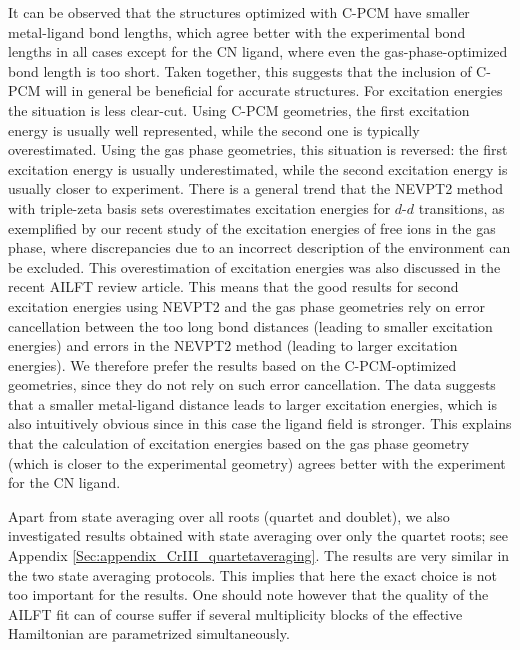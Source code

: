 It can be observed that the structures optimized with C-PCM have smaller metal-ligand bond lengths, which agree better with the experimental bond lengths in all cases except for the CN\textsuperscript{\textminus} ligand, where even the gas-phase-optimized bond length is too short. Taken together, this suggests that the inclusion of C-PCM will in general be beneficial for accurate structures. For excitation energies the situation is less clear-cut. Using C-PCM geometries, the first excitation energy is usually well represented, while the second one is typically overestimated. Using the gas phase geometries, this situation is reversed: the first excitation energy is usually underestimated, while the second excitation energy is usually closer to experiment. There is a general trend that the NEVPT2 method with triple-zeta basis sets overestimates excitation energies for $d$-$d$ transitions, as exemplified by our recent study of the excitation energies of free ions in the gas phase,\cite{LangN_2019_104104} where discrepancies due to an incorrect description of the environment can be excluded. This overestimation of excitation energies was also discussed in the recent AILFT review article.\cite{SinghEAN_2017_2} This means that the good results for second excitation energies using NEVPT2 and the gas phase geometries rely on error cancellation between the too long bond distances (leading to smaller excitation energies) and errors in the NEVPT2 method (leading to larger excitation energies). We therefore prefer the results based on the \mbox{C-PCM}-optimized geometries, since they do not rely on such error cancellation. The data suggests that a smaller metal-ligand distance leads to larger excitation energies, which is also intuitively obvious since in this case the ligand field is stronger. This explains that the calculation of excitation energies based on the gas phase geometry (which is closer to the experimental geometry) agrees better with the experiment for the CN\textsuperscript{\textminus} ligand.

Apart from state averaging over all roots (quartet and doublet), we also investigated results obtained with state averaging over only the quartet roots; see Appendix \ref{Sec:appendix_CrIII_quartetaveraging}. The results are very similar in the two state averaging protocols. This implies that here the exact choice is not too important for the results. One should note however that the quality of the AILFT fit can of course suffer if several multiplicity blocks of the effective Hamiltonian are parametrized simultaneously.

